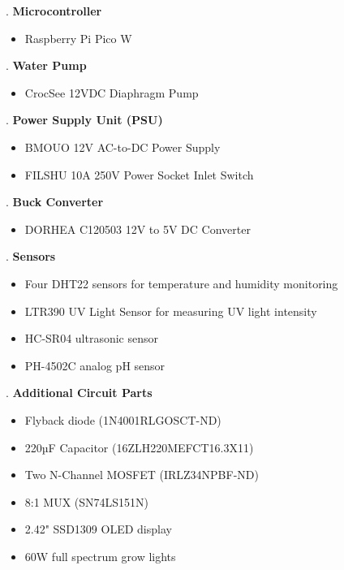 \documentclass[12pt]{article}
\begin{document}
. \textbf{Microcontroller}
\begin{itemize}
    \item Raspberry Pi Pico W
\end{itemize}

. \textbf{Water Pump}
\begin{itemize}
    \item CrocSee 12VDC Diaphragm Pump
\end{itemize}

. \textbf{Power Supply Unit (PSU)} 
\begin{itemize}
    \item BMOUO 12V AC-to-DC Power Supply 
    \item FILSHU 10A 250V Power Socket Inlet Switch
\end{itemize}

. \textbf{Buck Converter}
\begin{itemize}
    \item DORHEA C120503 12V to 5V DC Converter
\end{itemize}

. \textbf{Sensors}
   \begin{itemize}
   \item Four DHT22 sensors for temperature and humidity monitoring
   \item LTR390 UV Light Sensor for measuring UV light intensity
   \item HC-SR04 ultrasonic sensor
   \item PH-4502C analog pH sensor
   \end{itemize}

. \textbf{Additional Circuit Parts}
   \begin{itemize}
   \item Flyback diode (1N4001RLGOSCT-ND)
   \item 220µF Capacitor (16ZLH220MEFCT16.3X11)
   \item Two N-Channel MOSFET (IRLZ34NPBF-ND)
   \item 8:1 MUX (SN74LS151N)
   \item 2.42" SSD1309 OLED display
   \item 60W full spectrum grow lights
   \end{itemize}
\end{document}
